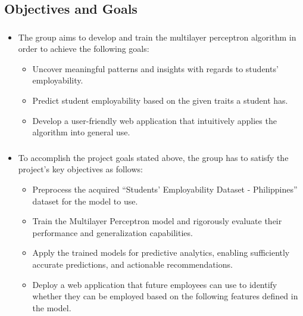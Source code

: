 \subsection{Objectives and Goals}
\begin{frame}
\frametitle{\subsecname}
	\begin{itemize}
		\item The group aims to develop and train the multilayer perceptron algorithm in order to achieve the following goals:
			\begin{itemize}
				\item Uncover meaningful patterns and insights with regards to students' employability.
				\item Predict student employability based on the given traits a student has.
				\item Develop a user-friendly web application that intuitively applies the algorithm into general use.
			\end{itemize}
	\end{itemize}
\end{frame}

\begin{frame}
\frametitle{\subsecname}
	\begin{itemize}
		\item To accomplish the project goals stated above, the group has to satisfy the project's key objectives as follows:
			\begin{itemize}
				\item Preprocess the acquired ``Students' Employability Dataset - Philippines'' dataset for the model to use.
				\item Train the Multilayer Perceptron model and rigorously evaluate their performance and generalization capabilities.
				\item Apply the trained models for predictive analytics, enabling sufficiently accurate predictions, and actionable recommendations.
				\item Deploy a web application that future employees can use to identify whether they can be employed based on the following features defined in the model.
			\end{itemize}
	\end{itemize}
\end{frame}
